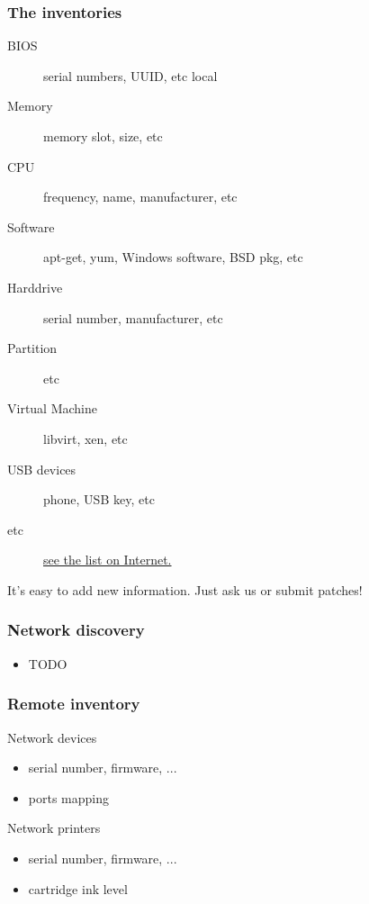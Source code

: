 \begin{frame}
    \frametitle{The inventories}

    \begin{description}
        \item[BIOS] serial numbers, UUID, etc local
        \item[Memory] memory slot, size, etc
        \item[CPU] frequency, name, manufacturer, etc
        \item[Software] apt-get, yum, Windows software, BSD pkg, etc
        \item[Harddrive] serial number, manufacturer, etc
        \item[Partition] etc
        \item[Virtual Machine] libvirt, xen, etc
        \item[USB devices] phone, USB key, etc
        \item[etc] \href{http://search.cpan.org/dist/FusionInventory-Agent/lib/FusionInventory/Agent/XML/Query/Inventory.pm}{see the list on Internet.}
    \end{description}

    It's easy to add new information. Just ask us or submit patches!

\end{frame}

\begin{frame}
    \frametitle{Network discovery}

    \begin{itemize}
        \item TODO
    \end{itemize}
\end{frame}

\begin{frame}
    \frametitle{Remote inventory}

    \begin{block}{Network devices}
        \begin{itemize}
            \item serial number, firmware, ...
            \item ports mapping
        \end{itemize}
    \end{block}

    \begin{block}{Network printers}
        \begin{itemize}
            \item serial number, firmware, ...
            \item cartridge ink level
        \end{itemize}
    \end{block}
\end{frame}

